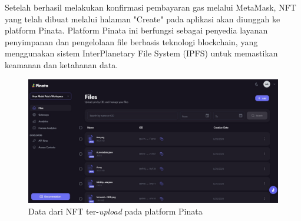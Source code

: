     Setelah berhasil melakukan konfirmasi pembayaran gas melalui MetaMask, NFT yang telah dibuat melalui halaman "Create" pada aplikasi akan diunggah ke platform Pinata. Platform Pinata ini berfungsi sebagai penyedia layanan penyimpanan dan pengelolaan file berbasis teknologi blockchain, yang menggunakan sistem InterPlanetary File System (IPFS) untuk memastikan keamanan dan ketahanan data.
    
    \begin{figure} [H] \centering
      \includegraphics[scale=0.25]{gambar/pinata.jpeg}
      \caption{Data dari NFT ter-\emph{upload} pada platform Pinata}
      \label{fig:pinata}
      \end{figure}

